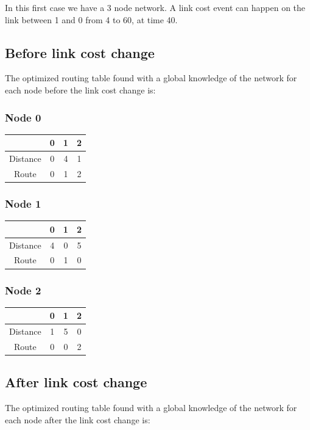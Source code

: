 \documentclass[a4paper,11pt,final]{report}
\begin{document}
In this first case we have a 3 node network. A link cost event can
happen on the link between 1 and 0 from 4 to 60, at time 40.

\subsection{Before link cost change}

The optimized routing table found with a global knowledge of the network
for each node before the link cost change is:

\subsubsection{Node 0}

\begin{tabular}{|c|c|c|c|}
\hline
& 0 & 1 & 2 \\ \hline
Distance & 0 & 4 & 1 \\ \hline
Route & 0 & 1 & 2 \\ \hline
\end{tabular}

\subsubsection{Node 1}

\begin{tabular}{|c|c|c|c|}
\hline
& 0 & 1 & 2 \\ \hline
Distance & 4 & 0 & 5 \\ \hline
Route & 0 & 1 & 0 \\ \hline
\end{tabular}

\subsubsection{Node 2}

\begin{tabular}{|c|c|c|c|}
\hline
& 0 & 1 & 2 \\ \hline
Distance & 1 & 5 & 0 \\ \hline
Route & 0 & 0 & 2 \\ \hline
\end{tabular}

\subsection{After link cost change}

The optimized routing table found with a global knowledge of the network
for each node after the link cost change is:
\end{document}
